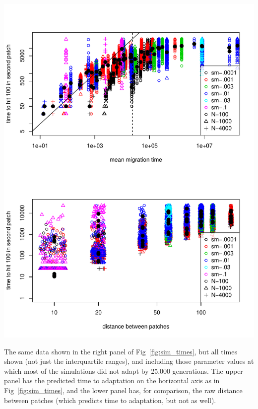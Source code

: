 \documentclass{article}
\begin{document}
\begin{sfigure}
  \begin{center}
    \includegraphics{migration-time-predicted}
  \end{center}
  \caption{
    The same data shown in the right panel of Fig~\ref{fig:sim_times},
    but all times shown (not just the interquartile ranges),
    and including those parameter values at which most of the simulations did not adapt by 25,000 generations.
    The upper panel has the predicted time to adaptation on the horizontal axis as in Fig~\ref{fig:sim_times},
    and the lower panel has, for comparison, the raw distance between patches 
    (which predicts time to adaptation, but not as well).
  } \label{sfig:sim_mutation_times}
\end{sfigure}

\end{document}
